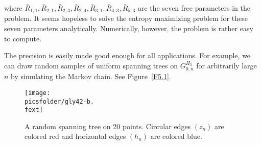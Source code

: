 \documentclass[11pt]{article}
\def\picsfolder{.}
\def\fext{pdf}
\def\fext{eps}
\providecommand{\1}{\mathBB{1}}
\newcommand{\ignore}[1]{}
\newcommand{\equ}[1]{(\ref{#1})}
\begin{document}
where $\bar R_{1,1},\bar R_{2,1},\bar R_{2,3},\bar R_{2,4},\bar R_{3,1},\bar R_{4,3},\bar R_{5,3}$ are the seven free parameters in the problem. It seems hopeless to solve the entropy maximizing problem for these seven parameters analytically. Numerically, however, the problem is rather easy to compute.
\ignore{
to get a closed form of the parameters that solve the maximizing problem for \equ{E6.03} but with a numerical scheme using MAPLE we could compute the values (in fact, with 100 digits precision):
\begin{equation}
\label{E6.05}
\begin{aligned}
\bar R_{1,1}&=0.69202867847165176793\\
\bar R_{2,1}&=0.38875672696616535394\\
\bar R_{2,3}&=0.25424132496148527486\\
\bar R_{2,4}&=0.22248654606766929211\\
\bar R_{3,1}&=0.52908551363574612516\\
\bar R_{4,3}&=0.79079967411811755990\\
\bar R_{5,3}&=0.65398566076417411609
\end{aligned}
\end{equation}
and
\begin{equation}
\label{E6.06}
\;\;H^R=1.06127506190503565203.
\end{equation}
}
The precision is easily made good enough for all applications. For example, we can draw random samples of uniform spanning trees on $G^{H_3}_{0,n}$ for arbitrarily large $n$ by simulating the Markov chain. See Figure~\ref{F5.1}.

\begin{figure}[h]
\centerline{\texttt{[image: \\picsfolder/gly42-b.\\fext]}}
\caption[b]{A random spanning tree on 20 points. Circular edges $(z_n)$ are colored red and horizontal edges $(h_n)$ are colored blue.}
\label{F6.1}
\end{figure}
\end{document}
